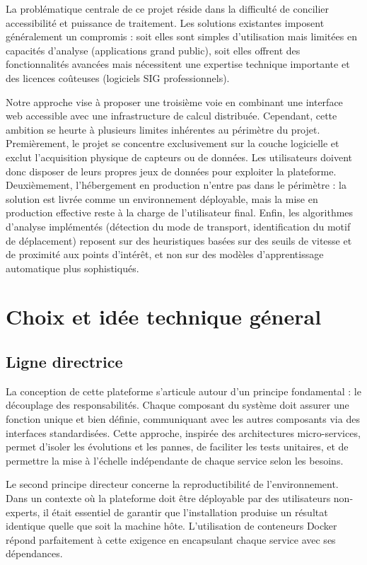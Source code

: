 \documentclass[french]{tai_info} %
\begin{document}
La problématique centrale de ce projet réside dans la difficulté de concilier accessibilité et puissance de traitement. Les solutions existantes imposent généralement un compromis : soit elles sont simples d'utilisation mais limitées en capacités d'analyse (applications grand public), soit elles offrent des fonctionnalités avancées mais nécessitent une expertise technique importante et des licences coûteuses (logiciels SIG professionnels).

Notre approche vise à proposer une troisième voie en combinant une interface web accessible avec une infrastructure de calcul distribuée. Cependant, cette ambition se heurte à plusieurs limites inhérentes au périmètre du projet. Premièrement, le projet se concentre exclusivement sur la couche logicielle et exclut l'acquisition physique de capteurs ou de données. Les utilisateurs doivent donc disposer de leurs propres jeux de données pour exploiter la plateforme. Deuxièmement, l'hébergement en production n'entre pas dans le périmètre : la solution est livrée comme un environnement déployable, mais la mise en production effective reste à la charge de l'utilisateur final. Enfin, les algorithmes d'analyse implémentés (détection du mode de transport, identification du motif de déplacement) reposent sur des heuristiques basées sur des seuils de vitesse et de proximité aux points d'intérêt, et non sur des modèles d'apprentissage automatique plus sophistiqués.

\section{Choix et idée technique géneral}

\subsection{Ligne directrice}

La conception de cette plateforme s'articule autour d'un principe fondamental : le découplage des responsabilités. Chaque composant du système doit assurer une fonction unique et bien définie, communiquant avec les autres composants via des interfaces standardisées. Cette approche, inspirée des architectures micro-services, permet d'isoler les évolutions et les pannes, de faciliter les tests unitaires, et de permettre la mise à l'échelle indépendante de chaque service selon les besoins.

Le second principe directeur concerne la reproductibilité de l'environnement. Dans un contexte où la plateforme doit être déployable par des utilisateurs non-experts, il était essentiel de garantir que l'installation produise un résultat identique quelle que soit la machine hôte. L'utilisation de conteneurs Docker répond parfaitement à cette exigence en encapsulant chaque service avec ses dépendances.
\end{document}

